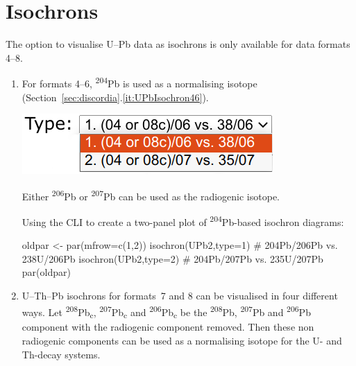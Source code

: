 \begin{refsection}
\begin{enumerate}
\end{enumerate}

\section{Isochrons} \label{sec:UPb-isochron-R}

The option to visualise U--Pb data as isochrons is only available for
data formats 4--8.

\begin{enumerate}

  \item For formats 4--6, \textsuperscript{204}Pb is used as a
    normalising isotope
    (Section~\ref{sec:discordia}.\ref{it:UPbIsochron46}).

\noindent\begin{minipage}[t]{.3\linewidth}
\strut\vspace*{-\baselineskip}\newline
\includegraphics[width=\linewidth]{../figures/UPbIsochron.png}
\end{minipage}
\begin{minipage}[t]{.7\linewidth}
Either \textsuperscript{206}Pb or \textsuperscript{207}Pb can be used
as the radiogenic isotope.
\end{minipage}

\noindent Using the CLI to create a two-panel plot of
\textsuperscript{204}Pb-based isochron diagrams:
\begin{script}
oldpar <- par(mfrow=c(1,2))
isochron(UPb2,type=1) # 204Pb/206Pb vs. 238U/206Pb
isochron(UPb2,type=2) # 204Pb/207Pb vs. 235U/207Pb
par(oldpar)
\end{script}

\item U--Th--Pb isochrons for formats~7 and 8 can be visualised in
  four different ways. Let \textsuperscript{208}Pb\textsubscript{c},
  \textsuperscript{207}Pb\textsubscript{c} and
  \textsuperscript{206}Pb\textsubscript{c} be the
  \textsuperscript{208}Pb, \textsuperscript{207}Pb and
  \textsuperscript{206}Pb component with the radiogenic component
  removed. Then these non radiogenic components can be used as a
  normalising isotope for the U- and Th-decay systems.


\end{enumerate}
\end{refsection}
